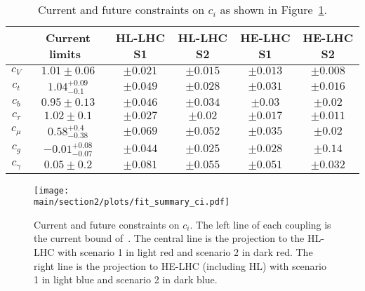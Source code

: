 \begin{table}[ht!]
\begin{center}
\begin{tabular}{ |c||c|c|c|c|c|}
  \hline
  & Current limits~\cite{deBlas:2018tjm}  & HL-LHC S1 & HL-LHC S2 & HE-LHC S1&HE-LHC S2 \\
  \hline
   $c_{V}$&$1.01\pm0.06$ &$\pm 0.021$&$\pm 0.015$&$\pm 0.013$&$\pm 0.008$\\
  $c_{t}$&$1.04^{+0.09}_{-0.1}$&$\pm 0.049$&$\pm 0.028$&$\pm 0.031$&$\pm 0.016$\\
  $c_{b}$&$0.95\pm0.13$ &$\pm 0.046$&$\pm 0.034$&$\pm 0.03$&$\pm 0.02$ \\
  $c_{\tau}$&$1.02\pm 0.1$ &$\pm 0.027$&$\pm 0.02$& $\pm 0.017$&$\pm 0.011$\\
  $c_{\mu}$&$0.58^{+0.4}_{-0.38} $ &$\pm 0.069$&$\pm 0.052$& $\pm 0.035$&$\pm 0.02$\\
  $c_{g}$&$-0.01^{+0.08}_{-0.07} $ &$\pm 0.044$&$\pm 0.025$& $\pm 0.028$&$\pm 0.14$\\
  $c_{\gamma}$ &$0.05\pm0.2 $&$\pm 0.081$&$\pm 0.055$&$\pm 0.051$&$\pm 0.032$\\
\hline
\end{tabular}
\caption{Current and future constraints on $c_{i}$ as shown in Figure~\ref{fig:projection.ci}.}\label{tab:projection.ci}
\end{center}
\end{table}
%
\begin{figure}[ht]
\texttt{[image: \\main/section2/plots/fit\_summary\_ci.pdf]}
\caption{Current and future constraints on $c_{i}$. The left line of each coupling is the current bound of~\cite{deBlas:2018tjm}. The central line is the projection to the HL-LHC with scenario 1 in light red and scenario 2 in dark red. The right line is the projection to HE-LHC (including HL) with scenario 1 in light blue and scenario 2 in dark blue.}\label{fig:projection.ci}
\end{figure}

